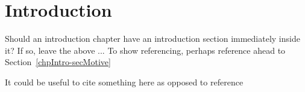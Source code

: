 
\section{Introduction}
\label{chpIntro-secIntro}

Should an introduction chapter have an introduction section immediately inside it? If so, leave the above ...
To show referencing, perhaps reference ahead to Section~\ref{chpIntro-secMotive}

It could be useful to cite something here as opposed to reference\cite{JackKurzweil2000}


